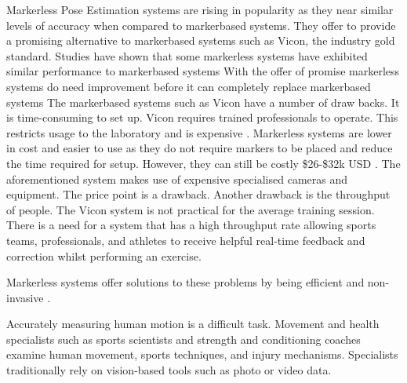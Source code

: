 \renewcommand{\labelenumii}{\arabic{enumi}.\arabic{enumii}}
\renewcommand{\labelenumiii}{\arabic{enumi}.\arabic{enumii}.\arabic{enumiii}}
\renewcommand{\labelenumiv}{\arabic{enumi}.\arabic{enumii}.\arabic{enumiii}.\arabic{enumiv}}

\label{chap:introduction}

\label{sec:background}

Markerless Pose Estimation systems are rising in popularity as they near similar levels of accuracy when compared to markerbased systems. They offer to provide a 
promising alternative to markerbased systems such as Vicon, the industry gold standard. \cite{federolf2025validation, Matsuda2025, Hansen2024, Song2022}
Studies have shown that some markerless systems have exhibited similar performance to markerbased systems \cite{yang2025comparison,wren2023comparison}
With the offer of promise markerless systems do need improvement before it can completely replace markerbased systems \cite{tang2024differences,nishikawa2025comparison,wishaupt2024applicability,thomas2025comparison}
The markerbased systems such as Vicon have a number of draw backs.
It is time-consuming to set up. Vicon requires trained professionals to operate. This restricts usage to the laboratory and is expensive \cite{MercadalBaudart2024, Kuster2016}. 
Markerless systems are lower in cost and easier to use as they do not require markers to be placed and reduce the time required for setup. However, they can still be costly \$26-\$32k USD \cite{muir2021}.
The aforementioned system makes use of expensive specialised cameras and equipment. The price point is a drawback. Another drawback is the throughput of people. The Vicon system is not practical for the average training session. There is a need for a system that has a high throughput rate allowing sports teams, professionals, and athletes to receive helpful real-time feedback and correction whilst performing an exercise.

Markerless systems offer solutions to these problems by being efficient and non-invasive \cite{federolf2025validation}.



Accurately measuring human motion is a difficult task. Movement and health specialists such as sports scientists and strength and conditioning coaches examine human movement, sports techniques, and injury mechanisms. Specialists traditionally rely on vision-based tools such as photo or video data.



